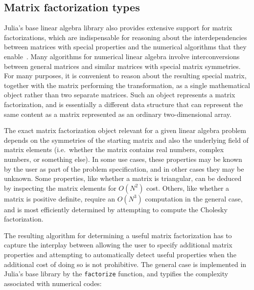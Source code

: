 \documentclass[10pt, preprint]{sigplanconf}
\begin{document}
\subsection{Matrix factorization types}

Julia's base linear algebra library also provides extensive support for matrix
factorizations, which are indispensable for reasoning about the
interdependencies between matrices with special properties and the numerical
algorithms that they enable~\cite{Golub1996}. Many algorithms for numerical
linear algebra involve interconversions between general matrices and similar
matrices with special matrix symmetries. For many purposes, it is convenient to
reason about the resulting special matrix, together with the matrix performing
the transformation, as a single mathematical object rather than two separate
matrices. Such an object represents a matrix factorization, and is essentially
a different data structure that can represent the same content as a matrix
represented as an ordinary two-dimensional array.

The exact matrix factorization object relevant for a given linear algebra
problem depends on the symmetries of the starting matrix and also the
underlying field of matrix elements (i.e.\ whether the matrix contains real
numbers, complex numbers, or something else). In some use cases, these
properties may be known by the user as part of the problem specification, and
in other cases they may be unknown. Some properties, like whether a
matrix is triangular, can be deduced by inspecting the matrix elements for
$O(N^2)$ cost. Others, like whether a matrix is positive definite, require an
$O(N^3)$ computation in the general case, and is most efficiently determined by
attempting to compute the Cholesky factorization.

The resulting algorithm for determining a useful matrix factorization has to
capture the interplay between allowing the user to specify additional matrix
properties and attempting to automatically detect useful properties when the
additional cost of doing so is not prohibitive. The general case is implemented
in Julia's base library by the \verb|factorize| function, and typifies the
complexity associated with numerical codes: 
\end{document}
